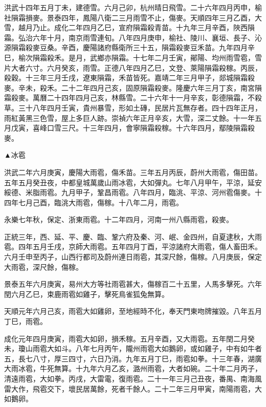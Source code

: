 \begin{pinyinscope}
洪武十四年五月丁未，建德雪。六月己卯，杭州晴日飛雪。二十六年四月丙申，榆社隕霜損麥。景泰四年，鳳陽八衛二三月雨雪不止，傷麥。天順四年三月乙酉，大雪，越月乃止。成化二年四月乙巳，宣府隕霜殺青苗。十九年三月辛酉，陜西隕霜。弘治六年十月，南京雨雪連旬。八年四月庚申，榆社、陵川、襄垣、長子、沁源隕霜殺麥豆桑。辛酉，慶陽諸府縣衛所三十五，隕霜殺麥豆禾苗。九年四月辛巳，榆次隕霜殺禾。是月，武鄉亦隕霜。十七年二月壬寅，鄖陽、均州雨雪雹，雪片大者六寸。六月癸亥，雨雪。正德八年四月乙巳，文登、萊陽隕霜殺稼。丙辰，殺穀。十三年三月壬戌，遼東隕霜，禾苗皆死。嘉靖二年三月甲子，郯城隕霜殺麥。辛未，殺禾。二十二年四月己亥，固原隕霜殺麥。隆慶六年三月丁亥，南宮隕霜殺麥。萬曆二十四年四月己亥，林縣雪。二十六年十一月辛亥，彰德隕霜，不殺草。三十八年四月壬寅，貴州暴雪，形如土磚，民居片瓦無存者。四十四年正月，雨紅黃黑三色雪，屋上多巨人跡。崇禎六年正月辛亥，大雪，深二丈餘。十一年五月戊寅，喜峰口雪三尺。十三年四月，會寧隕霜殺稼。十六年四月，鄢陵隕霜殺麥。

▲冰雹

洪武二年六月庚寅，慶陽大雨雹，傷禾苗。三年五月丙辰，蔚州大雨雹，傷田苗。五年五月癸丑夜，中都皇城萬歲山雨冰雹，大如彈丸。七年八月甲午，平涼，延安綏德、米脂雨雹。九月甲子，鞏昌雨雹。八年四月，臨洮、平涼、河州雹傷麥。十四年七月己酉，臨洮大雨雹，傷稼。十八年二月，雨雹。

永樂七年秋，保定、浙東雨雹。十二年四月，河南一州八縣雨雹，殺麥。

正統三年，西、延、平、慶、臨、鞏六府及秦、河、岷、金四州，自夏逮秋，大雨雹。四年五月壬戌，京師大雨雹。五年四月丁酉，平涼諸府大雨雹，傷人畜田禾。六月壬申至丙子，山西行都司及蔚州連日雨雹，其深尺餘，傷稼。八月庚辰，保定大雨雹，深尺餘，傷稼。

景泰五年六月庚寅，易州大方等社雨雹甚大，傷稼百二十五里，人馬多擊死。六年閏六月乙巳，束鹿雨雹如雞子，擊死鳥雀狐兔無算。

天順元年六月己亥，雨雹大如雞卵，至地經時不化，奉天門東吻牌摧毀。八年五月丁巳，雨雹。

成化元年四月庚寅，雨雹大如卵，損禾稼。五月辛酉，又大雨雹。五年閏二月癸未，瓊山雨雹大如斗。八年七月丙午，隴州雨雹大如鵝卵，或如雞子，中有如牛者五，長七八寸，厚三四寸，六日乃消。九年五月丁巳，雨雹如拳。十三年春，湖廣大雨冰雹，牛死無算。十九年六月乙亥，潞州雨雹，大者如碗。二十年二月丙子，清遠雨雹，大如拳。丙戌，大雷電，復雨雹。二十一年三月己丑夜，番禺、南海風雷大作，飛雹交下，壞民居萬餘，死者千餘人。二十二年三月甲寅，南陽雨雹，大如鵝卵。


\end{pinyinscope}
